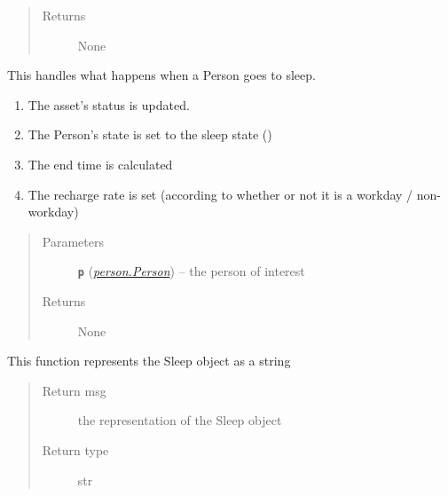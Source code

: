 \documentclass[letterpaper,10pt,english]{sphinxmanual}
\begin{document}
\begin{fulllineitems}
\begin{fulllineitems}
\begin{quote}
\begin{description}
\item[{Returns}] \leavevmode
None

\end{description}\end{quote}

\end{fulllineitems}


\begin{fulllineitems}
\label{sleep:sleep.Sleep.start_sleep}
This handles what happens when a Person goes to sleep.
\begin{enumerate}
\item {} 
The asset's status is updated.

\item {} 
The Person's state is set to the sleep state ()

\item {} 
The end time is calculated

\item {} 
The recharge rate is set (according to whether or not it is a workday / non-workday)

\end{enumerate}
\begin{quote}\begin{description}
\item[{Parameters}] \leavevmode
\textbf{\texttt{p}} ({\hyperref[person:person.Person]{\emph{\emph{person.Person}}}}) -- the person of interest

\item[{Returns}] \leavevmode
None

\end{description}\end{quote}

\end{fulllineitems}


\begin{fulllineitems}
\label{sleep:sleep.Sleep.toString}
This function represents the Sleep object as a string
\begin{quote}\begin{description}
\item[{Return msg}] \leavevmode
the representation of the Sleep object

\item[{Return type}] \leavevmode
str

\end{description}\end{quote}

\end{fulllineitems}


\end{fulllineitems}
\end{document}
